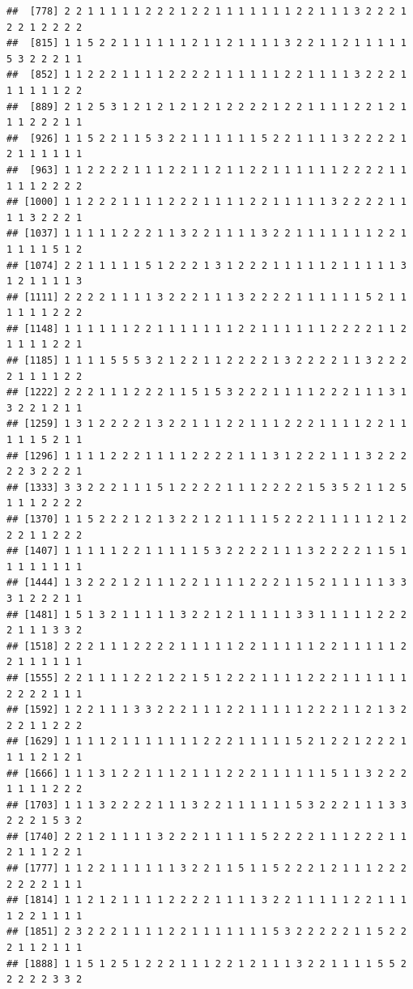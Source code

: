 \documentclass[
]{book}
\begin{document}
\begin{verbatim}
##  [778] 2 2 1 1 1 1 1 2 2 2 1 2 2 1 1 1 1 1 1 1 2 2 1 1 1 3 2 2 2 1 2 2 1 2 2 2 2
##  [815] 1 1 5 2 2 1 1 1 1 1 1 2 1 1 2 1 1 1 1 3 2 2 1 1 2 1 1 1 1 1 5 3 2 2 2 1 1
##  [852] 1 1 2 2 2 1 1 1 1 2 2 2 2 1 1 1 1 1 1 2 2 1 1 1 1 3 2 2 2 1 1 1 1 1 1 2 2
##  [889] 2 1 2 5 3 1 2 1 2 1 2 1 2 1 2 2 2 2 1 2 2 1 1 1 1 2 2 1 2 1 1 1 2 2 2 1 1
##  [926] 1 1 5 2 2 1 1 5 3 2 2 1 1 1 1 1 1 5 2 2 1 1 1 1 3 2 2 2 2 1 2 1 1 1 1 1 1
##  [963] 1 1 2 2 2 2 1 1 1 2 2 1 1 2 1 1 2 2 1 1 1 1 1 1 2 2 2 2 1 1 1 1 1 2 2 2 2
## [1000] 1 1 2 2 2 1 1 1 1 2 2 2 1 1 1 1 2 2 1 1 1 1 1 3 2 2 2 2 1 1 1 1 3 2 2 2 1
## [1037] 1 1 1 1 1 2 2 2 1 1 3 2 2 1 1 1 1 3 2 2 1 1 1 1 1 1 1 2 2 1 1 1 1 1 5 1 2
## [1074] 2 2 1 1 1 1 1 5 1 2 2 2 1 3 1 2 2 2 1 1 1 1 1 2 1 1 1 1 1 3 1 2 1 1 1 1 3
## [1111] 2 2 2 2 1 1 1 1 3 2 2 2 1 1 1 3 2 2 2 2 1 1 1 1 1 1 5 2 1 1 1 1 1 1 2 2 2
## [1148] 1 1 1 1 1 1 2 2 1 1 1 1 1 1 1 2 2 1 1 1 1 1 1 2 2 2 2 1 1 2 1 1 1 1 2 2 1
## [1185] 1 1 1 1 5 5 5 3 2 1 2 2 1 1 2 2 2 2 1 3 2 2 2 2 1 1 3 2 2 2 2 1 1 1 1 2 2
## [1222] 2 2 2 1 1 1 2 2 2 1 1 5 1 5 3 2 2 2 1 1 1 1 2 2 2 1 1 1 3 1 3 2 2 1 2 1 1
## [1259] 1 3 1 2 2 2 2 1 3 2 2 1 1 1 2 2 1 1 1 2 2 2 1 1 1 1 2 2 1 1 1 1 1 5 2 1 1
## [1296] 1 1 1 1 2 2 2 1 1 1 1 2 2 2 2 1 1 1 3 1 2 2 2 1 1 1 3 2 2 2 2 2 3 2 2 2 1
## [1333] 3 3 2 2 2 1 1 1 5 1 2 2 2 2 1 1 1 2 2 2 2 1 5 3 5 2 1 1 2 5 1 1 1 2 2 2 2
## [1370] 1 1 5 2 2 2 1 2 1 3 2 2 1 2 1 1 1 1 5 2 2 2 1 1 1 1 1 2 1 2 2 2 1 1 2 2 2
## [1407] 1 1 1 1 1 2 2 1 1 1 1 1 5 3 2 2 2 2 1 1 1 3 2 2 2 2 1 1 5 1 1 1 1 1 1 1 1
## [1444] 1 3 2 2 2 1 2 1 1 1 2 2 1 1 1 1 2 2 2 1 1 5 2 1 1 1 1 1 3 3 3 1 2 2 2 1 1
## [1481] 1 5 1 3 2 1 1 1 1 1 3 2 2 1 2 1 1 1 1 1 3 3 1 1 1 1 1 2 2 2 2 1 1 1 3 3 2
## [1518] 2 2 2 1 1 1 2 2 2 2 1 1 1 1 1 2 2 1 1 1 1 1 2 2 1 1 1 1 1 2 2 1 1 1 1 1 1
## [1555] 2 2 1 1 1 1 2 2 1 2 2 1 5 1 2 2 2 1 1 1 1 2 2 2 1 1 1 1 1 1 2 2 2 2 1 1 1
## [1592] 1 2 2 1 1 1 3 3 2 2 2 1 1 1 2 2 1 1 1 1 1 2 2 2 1 1 2 1 3 2 2 2 1 1 2 2 2
## [1629] 1 1 1 1 2 1 1 1 1 1 1 1 2 2 2 1 1 1 1 1 5 2 1 2 2 1 2 2 2 1 1 1 1 2 1 2 1
## [1666] 1 1 1 3 1 2 2 1 1 1 2 1 1 1 2 2 2 1 1 1 1 1 1 5 1 1 3 2 2 2 1 1 1 1 2 2 2
## [1703] 1 1 1 3 2 2 2 2 1 1 1 3 2 2 1 1 1 1 1 1 5 3 2 2 2 1 1 1 3 3 2 2 2 1 5 3 2
## [1740] 2 2 1 2 1 1 1 1 3 2 2 2 1 1 1 1 1 5 2 2 2 2 1 1 1 2 2 2 1 1 2 1 1 1 2 2 1
## [1777] 1 1 2 2 1 1 1 1 1 1 3 2 2 1 1 5 1 1 5 2 2 2 1 2 1 1 1 2 2 2 2 2 2 2 1 1 1
## [1814] 1 1 2 1 2 1 1 1 1 2 2 2 2 1 1 1 1 3 2 2 1 1 1 1 1 2 2 1 1 1 1 2 2 1 1 1 1
## [1851] 2 3 2 2 2 1 1 1 1 2 2 1 1 1 1 1 1 1 5 3 2 2 2 2 2 1 1 5 2 2 2 1 1 2 1 1 1
## [1888] 1 1 5 1 2 5 1 2 2 2 1 1 1 2 2 1 2 1 1 1 3 2 2 1 1 1 1 5 5 2 2 2 2 2 3 3 2

\end{verbatim}
\end{document}
